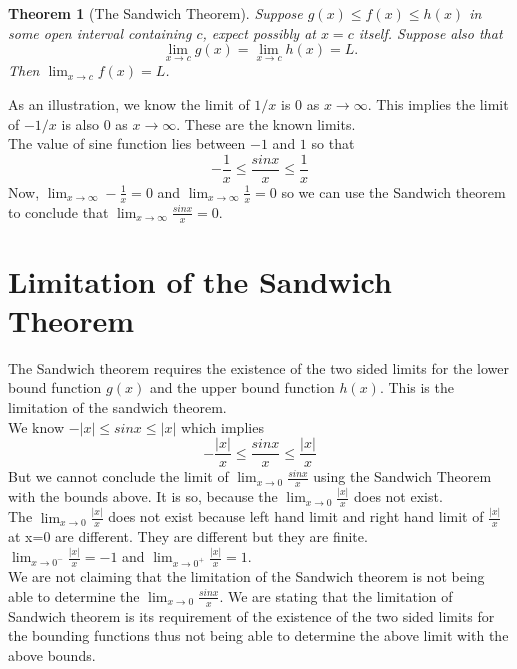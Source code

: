\documentclass[a4paper,twoside,12pt]{article}
\theoremstyle{plain}
\newtheorem{theorem}{Theorem}[section]
\theoremstyle{definition}
\begin{document}
\begin{theorem}[The Sandwich Theorem] \cite{thomas}
Suppose $g(x) \leq f(x) \leq h(x)$ in some open interval containing $c$, expect possibly at $x=c$ itself. Suppose also that $$\lim_{x \to c} g(x) = \lim_{x \to c} h(x) =L  .$$ Then $\displaystyle \lim_{x \to c} f(x)=L$.
\end{theorem}


As an illustration, we know the limit of \(1/x\) is \(0\) as \(x
\to \infty\). This implies the limit of \(-1/x\) is also \(0\) as \(x \to \infty\). These are the known limits.\\
The value of sine function lies between \(-1\) and \(1\) so that \[\displaystyle -\frac{1}{x} \leq \frac{sinx}{x} \leq \frac{1}{x}\]
Now, \(\displaystyle \lim_{x \to \infty} -\frac{1}{x}=0\) and \(\displaystyle \lim_{x \to \infty} \frac{1}{x}=0\) so we can use the Sandwich theorem to conclude that \(\displaystyle \lim_{x \to \infty} \frac{sinx}{x}=0\).
\vspace{5mm}
\section{Limitation of the Sandwich Theorem}
The Sandwich theorem requires the existence of the two sided limits for the lower bound function $g(x)$ and the upper bound function $h(x)$. This is the limitation of the sandwich theorem. \\
We know \(\displaystyle - \left | x \right | \leq sinx \leq \left | x \right | \) which implies \[-\frac{\left | x \right |}{x} \leq \frac{sinx}{x} \leq \frac{\left | x \right |}{x}\]
But we cannot conclude the limit of \(\displaystyle \lim_{x \to 0} \frac{sinx}{x}\) using the Sandwich Theorem with the bounds above. It is so, because the \(\displaystyle \lim_{x \to 0} \frac{|x|}{x}\) does not exist. \\[2mm]
The \(\displaystyle \lim_{x \to 0} \frac{|x|}{x}\) does not exist because left hand limit and right hand limit of \(\displaystyle \frac{|x|}{x}\) at x=0 are different. They are different but they are finite.\\
\(\displaystyle \lim_{x \to 0^-} \frac{|x|}{x}=-1\) \hspace{5mm} and \hspace{5cm} \(\displaystyle \lim_{x \to 0^+} \frac{|x|}{x}=1\). \\[3mm]
We are not claiming that the limitation of the Sandwich theorem is not being able to determine the \(\displaystyle \lim_{x \to 0} \frac{sinx}{x}\). We are stating that the limitation of Sandwich theorem is its requirement of  the existence of the two sided limits for the bounding functions thus not being able to determine the above limit with the above bounds.
\vspace{5mm}
\end{document}
